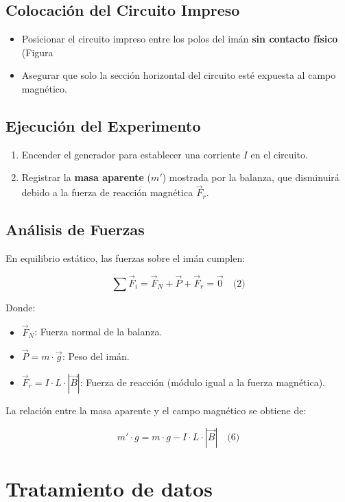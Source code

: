 \documentclass{article}
\begin{document}
\subsection{Colocación del Circuito Impreso}
\begin{itemize}
    \item Posicionar el circuito impreso entre los polos del imán \textbf{sin contacto físico} (Figura 
    \item Asegurar que solo la sección horizontal del circuito esté expuesta al campo magnético.
\end{itemize}

\subsection{Ejecución del Experimento}
\begin{enumerate}
    \item Encender el generador para establecer una corriente \( I \) en el circuito.
    \item Registrar la \textbf{masa aparente} (\( m' \)) mostrada por la balanza, que disminuirá debido a la fuerza de reacción magnética \( \vec{F}_r \).
\end{enumerate}

\subsection{Análisis de Fuerzas}
En equilibrio estático, las fuerzas sobre el imán cumplen:

\[
\sum \vec{F}_i = \vec{F}_N + \vec{P} + \vec{F}_r = \vec{0} \quad \text{(2)}
\]

Donde:
\begin{itemize}
    \item \( \vec{F}_N \): Fuerza normal de la balanza.
    \item \( \vec{P} = m \cdot \vec{g} \): Peso del imán.
    \item \( \vec{F}_r = I \cdot L \cdot |\vec{B}| \): Fuerza de reacción (módulo igual a la fuerza magnética).
\end{itemize}

La relación entre la masa aparente y el campo magnético se obtiene de:

\[
m' \cdot g = m \cdot g - I \cdot L \cdot |\vec{B}| \quad \text{(6)}
\]

\section{Tratamiento de datos}
\end{document}
